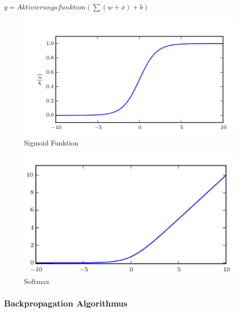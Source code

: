 \documentclass{llncs}
\begin{document}
\begin{math}
y = Aktivierungsfunktion(\sum(w+x)+b)                
\end{math}

\begin{figure}[htbp] 
	\centering
	\includegraphics[width=1.0\textwidth]{sigmoid.png}
	\caption{Sigmoid Funktion}
	\label{fig:Bild3}
\end{figure}

\begin{figure}[htbp] 
	\centering
	\includegraphics[width=1.0\textwidth]{softmax.png}
	\caption{Softmax}
	\label{fig:Bild4}
\end{figure}


\subsubsection{Backpropagation Algorithmus}
\end{document}
